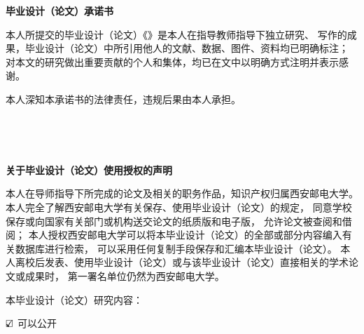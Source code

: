 \thispagestyle{empty}
\vspace*{0.5em}
{\songti\fontsize{16pt}{20pt}\bfseries\selectfont\centering \textbf{毕业设计（论文）承诺书}\par}
\vspace*{20pt}
\makeatletter\linespread{1.2}\selectfont
本人所提交的毕业设计（论文）《\@thesistitle》是本人在指导教师指导下独立研究、
写作的成果，毕业设计（论文）中所引用他人的文献、数据、图件、资料均已明确标注；
对本文的研究做出重要贡献的个人和集体，均已在文中以明确方式注明并表示感谢。
\makeatother

本人深知本承诺书的法律责任，违规后果由本人承担。

\vspace{1cm}
\noindent\begin{minipage}[c]{0.45\textwidth}
\begin{flushleft}
\underline{\hspace{0.6\textwidth}} \\
\end{flushleft}
\end{minipage}
\hfill
\begin{minipage}{0.45\textwidth}
\begin{flushright}
\underline{\hspace{0.6\textwidth}} \\
\end{flushright}
\end{minipage}



\vspace{2cm}



{\songti\fontsize{16pt}{19.2pt}\selectfont\centering \textbf{关于毕业设计（论文）使用授权的声明}\par}
\vspace*{20pt}
本人在导师指导下所完成的论文及相关的职务作品，知识产权归属西安邮电大学。
本人完全了解西安邮电大学有关保存、使用毕业设计（论文）的规定，
同意学校保存或向国家有关部门或机构送交论文的纸质版和电子版，
允许论文被查阅和借阅；
本人授权西安邮电大学可以将本毕业设计（论文）的全部或部分内容编入有关数据库进行检索，
可以采用任何复制手段保存和汇编本毕业设计（论文）。
本人离校后发表、使用毕业设计（论文）或与该毕业设计（论文）直接相关的学术论文或成果时，
第一署名单位仍然为西安邮电大学。

本毕业设计（论文）研究内容：

\(\rlap{$\checkmark$}\Box\)  可以公开

